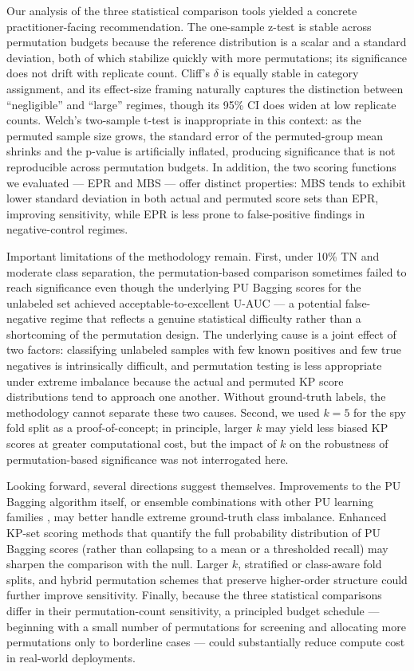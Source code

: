 \documentclass[11pt]{article}
\begin{document}
Our analysis of the three statistical comparison tools yielded a concrete practitioner-facing recommendation. The one-sample z-test is stable across permutation budgets because the reference distribution is a scalar and a standard deviation, both of which stabilize quickly with more permutations; its significance does not drift with replicate count. Cliff's $\delta$ \cite{cliff1993dominance} is equally stable in category assignment, and its effect-size framing naturally captures the distinction between ``negligible'' and ``large'' regimes, though its 95\% CI does widen at low replicate counts. Welch's two-sample t-test \cite{ojala2010permutation} is inappropriate in this context: as the permuted sample size grows, the standard error of the permuted-group mean shrinks and the p-value is artificially inflated, producing significance that is not reproducible across permutation budgets. In addition, the two scoring functions we evaluated --- EPR \cite{cheng2015epr} and MBS --- offer distinct properties: MBS tends to exhibit lower standard deviation in both actual and permuted score sets than EPR, improving sensitivity, while EPR is less prone to false-positive findings in negative-control regimes.

Important limitations of the methodology remain. First, under 10\% TN and moderate class separation, the permutation-based comparison sometimes failed to reach significance even though the underlying PU Bagging scores for the unlabeled set achieved acceptable-to-excellent U-AUC --- a potential false-negative regime that reflects a genuine statistical difficulty rather than a shortcoming of the permutation design. The underlying cause is a joint effect of two factors: classifying unlabeled samples with few known positives and few true negatives is intrinsically difficult, and permutation testing is less appropriate under extreme imbalance because the actual and permuted KP score distributions tend to approach one another. Without ground-truth labels, the methodology cannot separate these two causes. Second, we used $k = 5$ for the spy fold split as a proof-of-concept; in principle, larger $k$ may yield less biased KP scores at greater computational cost, but the impact of $k$ on the robustness of permutation-based significance was not interrogated here.

Looking forward, several directions suggest themselves. Improvements to the PU Bagging algorithm itself, or ensemble combinations with other PU learning families \cite{yang2014epu,wang2019nsemda,li2019protease}, may better handle extreme ground-truth class imbalance. Enhanced KP-set scoring methods that quantify the full probability distribution of PU Bagging scores (rather than collapsing to a mean or a thresholded recall) may sharpen the comparison with the null. Larger $k$, stratified or class-aware fold splits, and hybrid permutation schemes that preserve higher-order structure could further improve sensitivity. Finally, because the three statistical comparisons differ in their permutation-count sensitivity, a principled budget schedule --- beginning with a small number of permutations for screening and allocating more permutations only to borderline cases --- could substantially reduce compute cost in real-world deployments.
\end{document}
